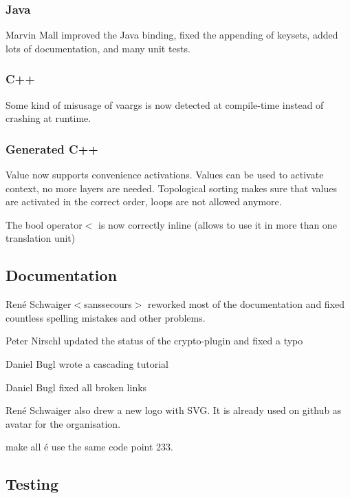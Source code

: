 \subsubsection*{Java}

Marvin Mall improved the Java binding, fixed the appending of keysets, added lots of documentation, and many unit tests.

\subsubsection*{C++}

Some kind of misusage of vaargs is now detected at compile-\/time instead of crashing at runtime.

\subsubsection*{Generated C++}

Value now supports convenience activations. Values can be used to activate context, no more layers are needed. Topological sorting makes sure that values are activated in the correct order, loops are not allowed anymore.

The {\ttfamily bool operator$<$} is now correctly inline (allows to use it in more than one translation unit)

\subsection*{Documentation}

René Schwaiger$<$sanssecours$>$ reworked most of the documentation and fixed countless spelling mistakes and other problems.


\begin{DoxyItemize}
\item Peter Nirschl updated the status of the crypto-\/plugin and fixed a typo
\item Daniel Bugl wrote a cascading tutorial
\item Daniel Bugl fixed all broken links
\item René Schwaiger also drew a new logo with S\+V\+G. It is already used on github as avatar for the organisation.
\item make all é use the same code point 233.
\end{DoxyItemize}

\subsection*{Testing}



